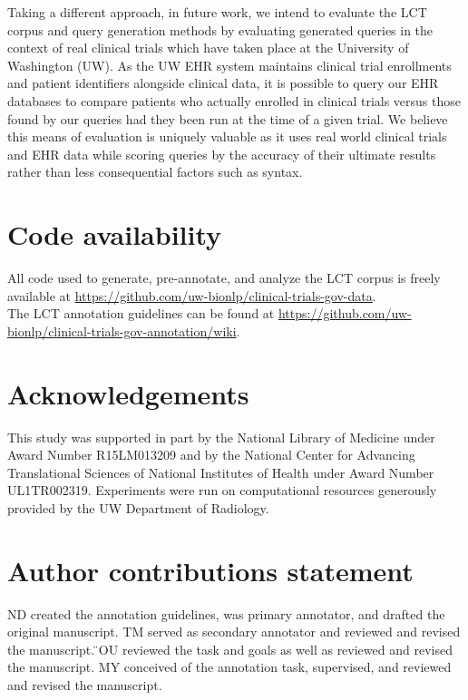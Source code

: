 \documentclass[fleqn,10pt]{wlscirep}
\begin{document}
\noindent Taking a different approach, in future work, we intend to evaluate the LCT corpus and query generation methods by evaluating generated queries in the context of real clinical trials which have taken place at the University of Washington (UW). As the UW EHR system maintains clinical trial enrollments and patient identifiers alongside clinical data, it is possible to query our EHR databases to compare patients who actually enrolled in clinical trials versus those found by our queries had they been run at the time of a given trial. We believe this means of evaluation is uniquely valuable as it uses real world clinical trials and EHR data while scoring queries by the accuracy of their ultimate results rather than less consequential factors such as syntax.

\section*{Code availability}
\label{sec:code_availability}
\noident All code used to generate, pre-annotate, and analyze the LCT corpus is freely available at \url{https://github.com/uw-bionlp/clinical-trials-gov-data}. \\

\noindent The LCT annotation guidelines can be found at \url{https://github.com/uw-bionlp/clinical-trials-gov-annotation/wiki}.

\section*{Acknowledgements} 

This study was supported in part by the National Library of Medicine under Award Number R15LM013209 and by the National Center for Advancing Translational Sciences of National Institutes of Health under Award Number UL1TR002319. Experiments were run on computational resources generously provided by the UW Department of Radiology.

\section*{Author contributions statement}

ND created the annotation guidelines, was primary annotator, and drafted the original manuscript. TM served as secondary annotator and reviewed and revised the manuscript. ̈OU reviewed the task and goals as well as reviewed and revised the manuscript. MY conceived of the annotation task, supervised, and reviewed and revised the manuscript.
\end{document}
